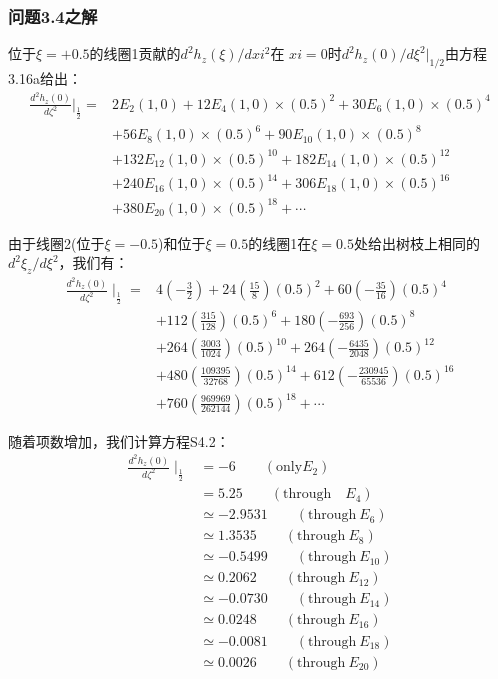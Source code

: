 \subsubsection{问题3.4之解}
位于$\xi=+0.5$的线圈1贡献的$d^2h_z(\xi)/dxi^2$在 $xi=0$时$d^2h_z(0)/d\xi^2|_{1/2}$由方程3.16a给出：
\begin{equation*}%
\begin{split}
\frac{d^2h_z(0)}{d\zeta^2}\big|_{\frac{1}{2}}=&2E_2(1,0)+12E_4(1,0)\times(0.5)^2+30E_6(1,0)\times(0.5)^4\\
&+56E_8(1,0)\times(0.5)^6+90E_{10}(1,0)\times(0.5)^8\\
&+132E_{12}(1,0)\times(0.5)^{10}+182E_{14}(1,0)\times(0.5)^{12}\\
&+240E_{16}(1,0)\times(0.5)^{14}+306E_{18}(1,0)\times(0.5)^{16}\\
&+380E_{20}(1,0)\times(0.5)^{18}+\cdots
\end{split}\tag{S4.1}
\end{equation*}

由于线圈2(位于$\xi=−0.5$)和位于$\xi=0.5$的线圈1在$\xi=0.5$处给出树枝上相同的$d^2\xi_z/d\xi^2$，我们有：
\begin{equation*}
\begin{split}
\frac{d^2h_z(0)}{d\zeta^2}\mid_{\frac{1}{2}}=&4(-\frac{3}{2})+24(\frac{15}{8})(0.5)^2+60(-\frac{35}{16})(0.5)^4\\
&+112(\frac{315}{128})(0.5)^6+180(-\frac{693}{256})(0.5)^8\\
&+264(\frac{3003}{1024})(0.5)^{10}+264(-\frac{6435}{2048})(0.5)^{12}\\
&+480(\frac{109395}{32768})(0.5)^{14}+612(-\frac{230945}{65536})(0.5)^{16}\\
&+760(\frac{969969}{262144})(0.5)^{18}+\cdots
\end{split}\tag{S4.2}
\end{equation*}

随着项数增加，我们计算方程S4.2：
\begin{align*}
\frac{d^2h_z(0)}{d\zeta^2}\mid_{\frac{1}{2}}&=-6\qquad (\mbox{only} E_2)\\
&=5.25  \qquad (\mbox{through}\quad E_4)\\
&\simeq -2.9531\qquad   (\mbox{through}\ E_6)\\
&\simeq 1.3535\qquad (\mbox{through}\ E_8)\\
&\simeq -0.5499\qquad   (\mbox{through}\ E_{10})\\
&\simeq 0.2062 \qquad (\mbox{through}\ E_{12})\\
&\simeq -0.0730\qquad   (\mbox{through}\ E_{14})\\
&\simeq 0.0248 \qquad  (\mbox{through}\ E_{16})\\
&\simeq-0.0081\qquad  (\mbox{through}\ E_{18})\\
&\simeq 0.0026 \qquad (\mbox{through}\ E_{20})
\end{align*}


